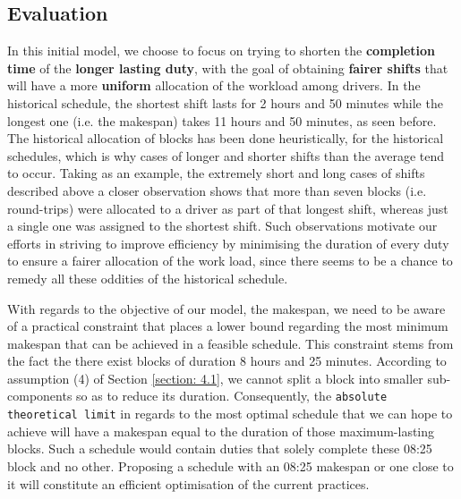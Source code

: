 \subsection*{Evaluation}
In this initial model, we choose to focus on trying to shorten the \textbf{completion time} of the \textbf{longer lasting duty}, with the goal of obtaining \textbf{fairer shifts }that will have a more \textbf{uniform} allocation of the workload among drivers. In the historical schedule, the shortest shift lasts for 2 hours and 50 minutes while the longest one (i.e. the makespan) takes 11 hours and 50 minutes, as seen before. The historical allocation of blocks has been done heuristically, for the historical schedules, which is why cases of longer and shorter shifts than the average tend to occur. Taking as an example, the extremely short and long cases of shifts described above a closer observation shows that more than seven blocks (i.e. round-trips) were allocated to a driver as part of that longest shift, whereas just a single one was assigned to the shortest shift. Such observations motivate our efforts in striving to improve efficiency by minimising the duration of every duty to ensure a fairer allocation of the work load, since there seems to be a chance to remedy all these oddities of the historical schedule.

\vspace{\baselineskip}
\noindent
With regards to the objective of our model, the makespan, we need to be aware of a practical constraint that places a lower bound regarding the most minimum makespan that can be achieved in a feasible schedule. This constraint stems from the fact the there exist blocks of duration 8 hours and 25 minutes. According to assumption (4) of Section \ref{section: 4.1}, we cannot split a block into smaller sub-components so as to reduce its duration. Consequently, the \texttt{absolute theoretical limit} in regards to the most optimal schedule that we can hope to achieve will have a makespan equal to the duration of those maximum-lasting blocks. Such a schedule would contain duties that solely complete these 08:25 block and no other. Proposing a schedule with an 08:25 makespan or one close to it will constitute an efficient optimisation of the current practices. 



